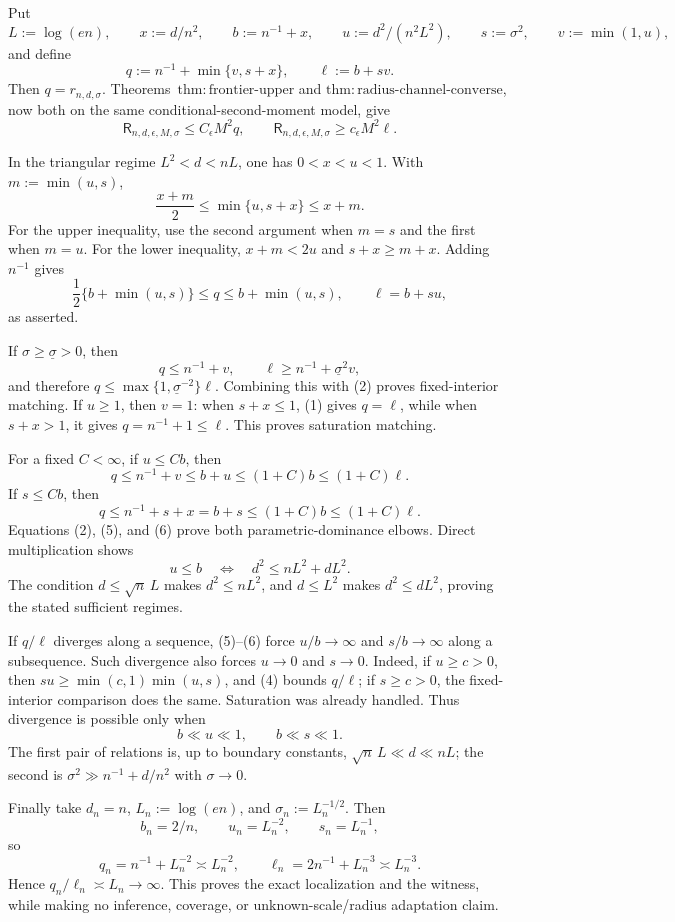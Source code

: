 Put
\[
 L:=\log(en),\qquad x:=d/n^2,\qquad b:=n^{-1}+x,\qquad
 u:=d^2/(n^2L^2),\qquad s:=\sigma^2,\qquad v:=\min(1,u),
\]
and define
\[
 q:=n^{-1}+\min\{v,s+x\},\qquad \ell:=b+sv.
\tag{1}
\]
Then \(q=r_{n,d,\sigma}\).  Theorems~\(\mathrm{thm:frontier\text{-}upper}\) and \(\mathrm{thm:radius\text{-}channel\text{-}converse}\), now both on the same conditional-second-moment model, give
\[
 \mathsf R_{n,d,\epsilon,M,\sigma}\le C_\epsilon M^2q,
 \qquad
 \mathsf R_{n,d,\epsilon,M,\sigma}\ge c_\epsilon M^2\ell.
\tag{2}
\]

In the triangular regime \(L^2<d<nL\), one has \(0<x<u<1\).  With \(m:=\min(u,s)\),
\[
 \frac{x+m}{2}\le\min\{u,s+x\}\le x+m.
\tag{3}
\]
For the upper inequality, use the second argument when \(m=s\) and the first when \(m=u\).  For the lower inequality, \(x+m<2u\) and \(s+x\ge m+x\).  Adding \(n^{-1}\) gives
\[
 \frac12\{b+\min(u,s)\}\le q\le b+\min(u,s),
 \qquad \ell=b+su,
\tag{4}
\]
as asserted.

If \(\sigma\ge\underline\sigma>0\), then
\[
 q\le n^{-1}+v,\qquad \ell\ge n^{-1}+\underline\sigma^2v,
\]
and therefore \(q\le\max\{1,\underline\sigma^{-2}\}\ell\).  Combining this with (2) proves fixed-interior matching.  If \(u\ge1\), then \(v=1\): when \(s+x\le1\), (1) gives \(q=\ell\), while when \(s+x>1\), it gives \(q=n^{-1}+1\le\ell\).  This proves saturation matching.

For a fixed \(C<\infty\), if \(u\le Cb\), then
\[
 q\le n^{-1}+v\le b+u\le(1+C)b\le(1+C)\ell.
\tag{5}
\]
If \(s\le Cb\), then
\[
 q\le n^{-1}+s+x=b+s\le(1+C)b\le(1+C)\ell.
\tag{6}
\]
Equations (2), (5), and (6) prove both parametric-dominance elbows.  Direct multiplication shows
\[
 u\le b\quad\Longleftrightarrow\quad d^2\le nL^2+dL^2.
\tag{7}
\]
The condition \(d\le\sqrt n\,L\) makes \(d^2\le nL^2\), and \(d\le L^2\) makes \(d^2\le dL^2\), proving the stated sufficient regimes.

If \(q/\ell\) diverges along a sequence, (5)--(6) force \(u/b\to\infty\) and \(s/b\to\infty\) along a subsequence.  Such divergence also forces \(u\to0\) and \(s\to0\).  Indeed, if \(u\ge c>0\), then \(su\ge\min(c,1)\min(u,s)\), and (4) bounds \(q/\ell\); if \(s\ge c>0\), the fixed-interior comparison does the same.  Saturation was already handled.  Thus divergence is possible only when
\[
 b\ll u\ll1,\qquad b\ll s\ll1.
\tag{8}
\]
The first pair of relations is, up to boundary constants, \(\sqrt n\,L\ll d\ll nL\); the second is \(\sigma^2\gg n^{-1}+d/n^2\) with \(\sigma\to0\).

Finally take \(d_n=n\), \(L_n:=\log(en)\), and \(\sigma_n:=L_n^{-1/2}\).  Then
\[
 b_n=2/n,\qquad u_n=L_n^{-2},\qquad s_n=L_n^{-1},
\]
so
\[
 q_n=n^{-1}+L_n^{-2}\asymp L_n^{-2},\qquad
 \ell_n=2n^{-1}+L_n^{-3}\asymp L_n^{-3}.
\]
Hence \(q_n/\ell_n\asymp L_n\to\infty\).  This proves the exact localization and the witness, while making no inference, coverage, or unknown-scale/radius adaptation claim.